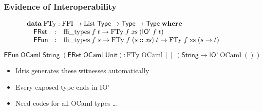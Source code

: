 \documentclass[aspectratio=169]{beamer}
\begin{document}
\begin{frame}[t]
  \frametitle{Evidence of Interoperability}

  \begin{displaymath}
    \begin{array}{@{}l}
      \textbf{data}\;\mathrm{FTy} : \mathrm{FFI} \to \mathrm{List}\;\textsf{Type} \to \textsf{Type} \to \textsf{Type}\;\textbf{where} \\
      \quad
      \begin{array}{@{}lcl}
        \textsf{FRet} &:& \textrm{ffi\_types}\;f\; t \to \mathrm{FTy}\;f\;\mathit{xs}\; (\textsf{IO'}\; f\; t) \\
        \textsf{FFun} &:& \textrm{ffi\_types}\; f\; s \to \mathrm{FTy}\; f\; (s :: \mathit{xs})\; t \to \mathrm{FTy}\; f\; \mathrm{xs}\; (s \to t)
      \end{array}
    \end{array}
  \end{displaymath}

  \bigskip

  \begin{displaymath}
    \textsf{FFun}\;\textsf{OCaml\_String}\;(\textsf{FRet}\;\textsf{OCaml\_Unit}) : \mathrm{FTy}\;\mathrm{OCaml}\;[]\;(\textsf{String} \to \textsf{IO'}\;\mathrm{OCaml}\;())
  \end{displaymath}

  \bigskip
  \pause

  \begin{itemize}
  \item Idris generates these witnesses automatically
  \item Every exposed type ends in \textsf{IO'}
  \item Need codes for all OCaml types \ldots
  \end{itemize}
\end{frame}
\end{document}
